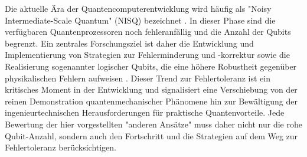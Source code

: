 \newline \newline
Die aktuelle Ära der Quantencomputerentwicklung wird häufig als "Noisy \linebreak Intermediate-Scale Quantum" (NISQ) bezeichnet \cite{chengNoisyIntermediatescaleQuantum2023}. In dieser Phase sind die verfügbaren Quantenprozessoren noch fehleranfällig und die Anzahl der Qubits begrenzt. Ein zentrales Forschungsziel ist daher die Entwicklung und Implementierung von Strategien zur Fehlerminderung und -korrektur sowie die Realisierung sogenannter logischer Qubits, die eine höhere Robustheit gegenüber physikalischen Fehlern aufweisen \cite{QuantumHardwareExplained}. Dieser Trend zur Fehlertoleranz ist ein kritisches Moment in der Entwicklung und signalisiert eine Verschiebung von der reinen Demonstration quantenmechanischer Phänomene hin zur Bewältigung der ingenieurtechnischen Herausforderungen für praktische Quantenvorteile. Jede Bewertung der hier vorgestellten "anderen Ansätze" muss daher nicht nur die rohe Qubit-Anzahl, sondern auch den Fortschritt und die Strategien auf dem Weg zur Fehlertoleranz berücksichtigen.




